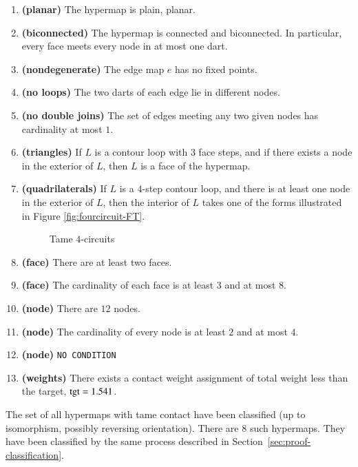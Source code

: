 \begin{enumerate}
    \label{definition:tame}
    \item {\bf (planar)} The hypermap is plain, planar.
    \item {\bf (biconnected)} The hypermap is connected and biconnected.  In particular, every face meets every node in at most one dart.
    \item {\bf (nondegenerate)} The edge map $e$ has no fixed points.
    \item {\bf (no loops)} The two darts of each edge lie in different nodes.
    \item {\bf (no double joins)} The set of edges meeting any two given nodes has cardinality at most $1$.
    \label{definition:tame:40}

    \item {\bf (triangles)} If $L$ is a contour loop with $3$ face steps, and if there exists a node in
    the exterior of $L$, then $L$ is a face of the hypermap.
    \label{definition:tame:3-circuit}

    \item {\bf (quadrilaterals)} If $L$ is a $4$-step contour loop, and there is at least one node
    in the exterior of $L$, then the interior of $L$ takes one of the forms
    illustrated in Figure
    \ref{fig:fourcircuit-FT}.
    \label{definition:tame:4-circuit-FT}
    \begin{figure}[htb]
        \centering
        \caption{Tame $4$-circuits}
        \label{fig:fourcircuitFT}
    \end{figure}
  \item {\bf (face)} There are at least two faces.
    \item {\bf (face)} The cardinality of each face is at least $3$ and at most $8$.
    \label{definition:tame:length}
    \item {\bf (node)} There are $12$ nodes.
    \item {\bf (node)} The cardinality of every node is at least $2$ and at most    $4$.
    \label{definition:tame:degree}
    \item {\bf (node)} {\tt NO CONDITION}
    \label{definition:tame:degreeE}
    \item {\bf (weights)} There exists a contact weight assignment
        of total weight less than the target, ${\operatorname{tgt}}=1.541$.
    \label{definition:tame:squander}
\end{enumerate}
%

The set of all hypermaps with tame contact have been classified (up to isomorphism, possibly reversing orientation).  There are $8$ such hypermaps.  They have been classified by the same process described in Section~\ref{sec:proof-classification}.



